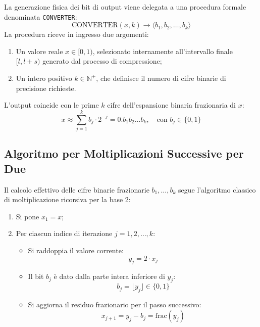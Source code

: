 La generazione fisica dei bit di output viene delegata a una procedura formale denominata \texttt{CONVERTER}:
\begin{equation}
  \text{CONVERTER}(x, k) \longrightarrow \langle b_1, b_2, \dots, b_k \rangle
\end{equation}
La procedura riceve in ingresso due argomenti:
\begin{enumerate}
  \item Un valore reale $x \in [0, 1)$, selezionato internamente all'intervallo finale $[l, l + s)$ generato dal processo di compressione;
  \item Un intero positivo $k \in \mathbb{N}^+$, che definisce il numero di cifre binarie di precisione richieste.
\end{enumerate}

L'output coincide con le prime $k$ cifre dell'espansione binaria frazionaria di $x$:
\begin{equation}
  x \approx \sum_{j=1}^{k} b_j \cdot 2^{-j} = 0.b_1 b_2 \dots b_k, \quad \text{con } b_j \in \{0, 1\}
\end{equation}

\FloatBarrier
\subsection{Algoritmo per Moltiplicazioni Successive per Due}
\label{subsec:algoritmo-moltiplicazioni-due}

Il calcolo effettivo delle cifre binarie frazionarie $b_1, \dots, b_k$ segue l'algoritmo classico di moltiplicazione ricorsiva per la base 2:
\begin{enumerate}
  \item Si pone $x_1 = x$;
  \item Per ciascun indice di iterazione $j = 1, 2, \dots, k$:
  \begin{itemize}
    \item Si raddoppia il valore corrente:
    \begin{equation}
      y_j = 2 \cdot x_j
    \end{equation}
    \item Il bit $b_j$ \`e dato dalla parte intera inferiore di $y_j$:
    \begin{equation}
      b_j = \lfloor y_j \rfloor \in \{0, 1\}
    \end{equation}
    \item Si aggiorna il residuo frazionario per il passo successivo:
    \begin{equation}
      x_{j+1} = y_j - b_j = \text{frac}(y_j)
    \end{equation}
  \end{itemize}
\end{enumerate}

